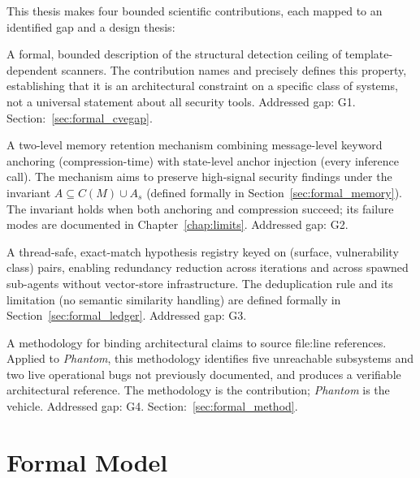 \documentclass[12pt, a4paper, oneside, openany]{book}
\newcommand{\Phant}{\textit{Phantom}}
\begin{document}
This thesis makes four bounded scientific contributions, each mapped
to an identified gap and a design thesis:

\begin{contribbox}
A formal, bounded description of the structural detection ceiling of
template-dependent scanners.  The contribution names and precisely
defines this property, establishing that it is an architectural
constraint on a specific class of systems, not a universal statement
about all security tools.  Addressed gap: G1.  Section:~\ref{sec:formal_cvegap}.
\end{contribbox}

\begin{contribbox}
A two-level memory retention mechanism combining message-level
keyword anchoring (compression-time) with state-level anchor
injection (every inference call).  The mechanism aims to preserve
high-signal security findings under the invariant $A \subseteq C(M)
\cup A_s$ (defined formally in Section~\ref{sec:formal_memory}).
The invariant holds when both anchoring and compression succeed; its
failure modes are documented in Chapter~\ref{chap:limits}.
Addressed gap: G2.
\end{contribbox}

\begin{contribbox}
A thread-safe, exact-match hypothesis registry keyed on
(surface, vulnerability class) pairs, enabling redundancy
reduction across iterations and across spawned sub-agents without
vector-store infrastructure.  The deduplication rule and its
limitation (no semantic similarity handling) are defined formally
in Section~\ref{sec:formal_ledger}.  Addressed gap: G3.
\end{contribbox}

\begin{contribbox}
A methodology for binding architectural claims to source file:line
references.  Applied to \Phant{}, this methodology identifies five
unreachable subsystems and two live operational bugs not previously
documented, and produces a verifiable architectural reference.
The methodology is the contribution; \Phant{} is the vehicle.
Addressed gap: G4.  Section:~\ref{sec:formal_method}.
\end{contribbox}

\chapter{Formal Model}
\label{chap:formal}
\end{document}
